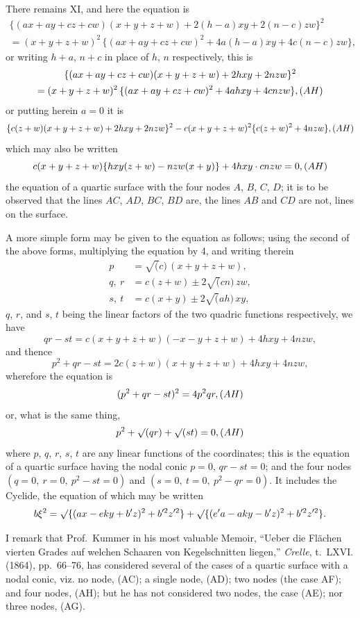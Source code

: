 \documentclass[11pt,a4paper]{article}
\begin{document}
There remains XI, and here the equation is
\begin{multline*}
\{(ax+ay+cz+cw)(x+y+z+w) + 2(h-a)xy + 2(n-c)zw\}^{2}\\
= (x+y+z+w)^{2}\, \{(ax+ay+cz+cw)^{2} + 4a(h-a)xy + 4c(n-c)zw\},
\end{multline*}
or writing $h+a$, $n+c$ in place of $h$, $n$ respectively, this is
\begin{multline*}
\{(ax+ay+cz+cw)(x+y+z+w) + 2hxy + 2nzw\}^{2}\\
= (x+y+z+w)^{2}\, \{(ax+ay+cz+cw)^{2} + 4ahxy + 4cnzw\},\hfill(AH)
\end{multline*}
or putting herein $a=0$ it is
\[
\{c(z+w)(x+y+z+w) + 2hxy + 2nzw\}^{2} - c(x+y+z+w)^{2}\{c(z+w)^{2} + 4nzw\},\hfill(AH)
\]
which may also be written
\[
c(x+y+z+w)\{hxy(z+w) - nzw(x+y)\} + 4hxy \cdot cnzw = 0,\hfill(AH)
\]
the equation of a quartic surface with the four nodes $A$, $B$, $C$, $D$; it is to be observed that the lines $AC$, $AD$, $BC$, $BD$ are, the lines $AB$ and $CD$ are not, lines on the surface.

A more simple form may be given to the equation as follows; using the second of the above forms, multiplying the equation by 4, and writing therein
\begin{align*}
p &= \surd(c)\, (x+y+z+w),\\
q,\ r &= c(z+w) \pm 2\surd(cn)\, zw,\\
s,\ t &= c(x+y) \pm 2\surd(ah)\, xy,
\end{align*}
$q$, $r$, and $s$, $t$ being the linear factors of the two quadric functions respectively, we have
\[
qr - st = c(x+y+z+w)(-x-y+z+w) + 4hxy + 4nzw,
\]
and thence
\[
p^{2} + qr - st = 2c(z+w)(x+y+z+w) + 4hxy + 4nzw,
\]
wherefore the equation is
\[
(p^{2} + qr - st)^{2} = 4p^{2}qr,\hfill(AH)
\]
or, what is the same thing,
\[
p^{2} + \surd(qr) + \surd(st) = 0,\hfill(AH)
\]
where $p$, $q$, $r$, $s$, $t$ are any linear functions of the coordinates; this is the equation of a quartic surface having the nodal conic $p=0$, $qr-st=0$; and the four nodes $(q=0,\ r=0,\ p^{2}-st=0)$ and $(s=0,\ t=0,\ p^{2}-qr=0)$. It includes the Cyclide, the equation of which may be written
\[
b\xi^{2} = \surd\{(ax - eky + b'z)^{2} + b'^{2}z'^{2}\} + \surd\{(e'a - aky - b'z)^{2} + b'^{2}z'^{2}\}.
\]

I remark that Prof.~Kummer in his most valuable Memoir, ``Ueber die Fl\"{a}chen vierten Grades auf welchen Schaaren von Kegelschnitten liegen,'' \textit{Crelle}, t.~LXVI. (1864), pp.~66--76, has considered several of the cases of a quartic surface with a nodal conic, viz. no node, (AC); a single node, (AD); two nodes (the case AF); and four nodes, (AH); but he has not considered two nodes, the case (AE); nor three nodes, (AG).
\end{document}
